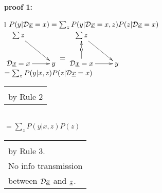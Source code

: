 \begin{claim} 
\label{cl-decBackDoor}
\decBackDoor
\end{claim}

\proof

{\bf * proof 1:}
\begin{longtable}{l}
\color{red}
$P(y|{\cal D}{\underline{x}}=x)=\sum_z
 P(y|{\cal D} {\underline{x}}=x, z)P(z|{\cal D}{\underline{x}} =x)$
\\
$\xymatrix{
\sum z\ar[dr]
\\
\cald \rvx=x\ar[r]
&y
}
\xymatrix{\\=}
\xymatrix{
\sum z\ar[dr]
\\
\cald \rvx=x\ar[r]\ar[u]|0
&y
}
$
\\
\color{red}
$=\sum_z P(y|x,z)P(z|{\cal D}{\underline{x}}=x)$
\\
\xymatrix{\\=}
\begin{tabular}{l}
\\
\\
by Rule 2
\end{tabular}
\\
\color{red}
$=\sum_z P(y|x,z)P(z)$
\\
\xymatrix{\\
=}
\begin{tabular}{l}\\
\\
by Rule 3.
\\
No info transmission\\
between ${\cal D}{\underline{x}}$ and ${\underline{z}}$.
\end{tabular}
\end{longtable}


